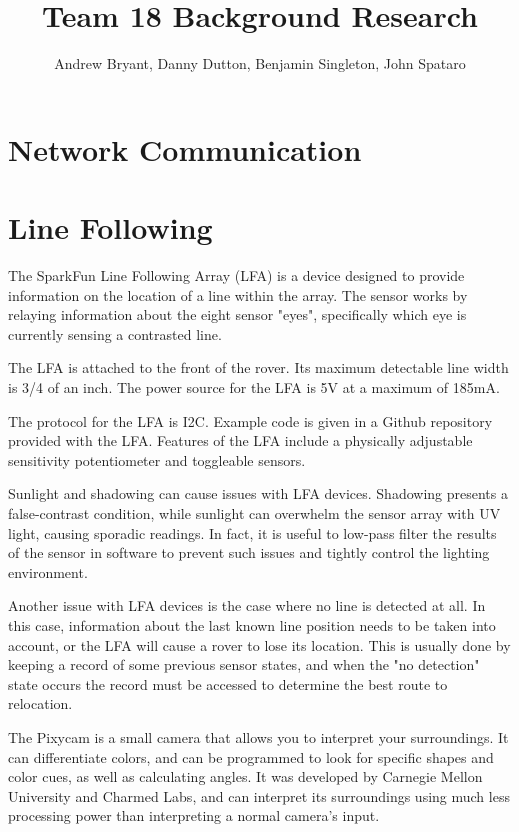\documentclass[12pt,letterpaper]{article}
\author{Andrew Bryant, Danny Dutton, Benjamin Singleton, John Spataro}
\title{Team 18 Background Research}
\begin{document}
\maketitle

\section{Network Communication}

\section{Line Following}
The SparkFun Line Following Array (LFA) is a device designed to provide information on the location of a line within the array. The sensor works by relaying information about the eight sensor "eyes", specifically which eye is currently sensing a contrasted line. 

The LFA is attached to the front of the rover. Its maximum detectable line width is 3/4 of an inch. The power source for the LFA is 5V at a maximum of 185mA. 

The protocol for the LFA is I2C. Example code is given in a Github repository provided with the LFA. Features of the LFA include a physically adjustable sensitivity potentiometer and toggleable sensors. 

Sunlight and shadowing can cause issues with LFA devices. Shadowing presents a false-contrast condition, while sunlight can overwhelm the sensor array with UV light, causing sporadic readings. In fact, it is useful to low-pass filter the results of the sensor in software to prevent such issues and tightly control the lighting environment.

Another issue with LFA devices is the case where no line is detected at all. In this case, information about the last known line position needs to be taken into account, or the LFA will cause a rover to lose its location. This is usually done by keeping a record of some previous sensor states, and when the "no detection" state occurs the record must be accessed to determine the best route to relocation.

The Pixycam is a small camera that allows you to interpret your surroundings. It can differentiate colors, and can be programmed to look for specific shapes and color cues, as well as calculating angles. It was developed by Carnegie Mellon University and Charmed Labs, and can interpret its surroundings using much less processing power than interpreting a normal camera’s input. 
\end{document}
